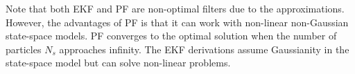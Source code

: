 \documentclass{article}
\begin{document}
Note that both EKF and PF are non-optimal filters due to the approximations. However, the advantages of PF is that it can work with non-linear non-Gaussian state-space models. PF converges to the optimal solution when the number of particles $N_s$ approaches infinity. The EKF derivations assume Gaussianity in the state-space model but can solve non-linear problems.


\printbibliography
\end{document}
